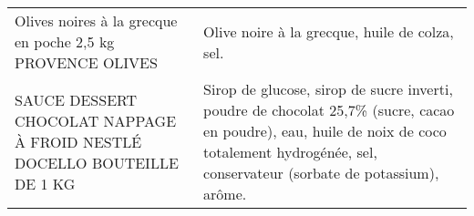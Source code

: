 \begin{longtable}{p{5cm}p{10cm}}
                                               Olives noires à la grecque en poche 2,5 kg PROVENCE OLIVES &                                                                                                                                                                                                                                                                                                                                                                                                                                                                                                                                                                                                                                                                                                                                                                                                                                                                                                                                                                                           Olive noire à la grecque, huile de colza, sel. \\
                                  SAUCE DESSERT CHOCOLAT NAPPAGE À FROID NESTLÉ DOCELLO BOUTEILLE DE 1 KG &                                                                                                                                                                                                                                                                                                                                                                                                                                                                                                                                                                                                                                                                                                                                                                                                                                          Sirop de glucose, sirop de sucre inverti, poudre de chocolat 25,7\% (sucre, cacao en poudre), eau, huile de noix de coco totalement hydrogénée, sel, conservateur (sorbate de potassium), arôme. \\

\end{longtable}
